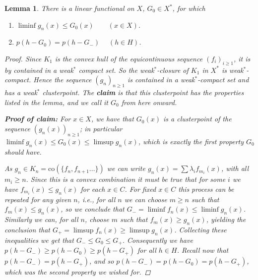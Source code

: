 \documentclass[10pt,twoside,openany,final]{memoir}
\theoremstyle{break}
\newtheorem{lemma}[section]{Lemma}
\theoremstyle{Break}
\begin{document}
\begin{lemma} \label{pryce 6}
There is a linear functional on $X$, $G_{0}\in X^*$, for which
\begin{enumerate}
\item $\liminf g_n(x) \leq G_{0}(x) \qquad (x\in X)$.
\item $p(h-G_{0})=p(h-G_{-}) \quad \; (h\in H)$.
\end{enumerate}
\begin{proof}
Since $K_1$ is the convex hull of the equicontinuous sequence $(f_i)_{i\geq1}$, it is by  contained in a weak$^*$ compact set. So the weak$^*$-closure of $K_1$ in $X^*$ is weak$^*$-compact.
Hence the sequence $(g_n)_{n\geq 1}$ is contained in a weak$^*$-compact set and has a weak$^*$ clusterpoint.
The \textbf{claim} is that this clusterpoint has the properties listed in the lemma, and we call it $G_0$ from here onward.

\textbf{Proof of claim:} For $x\in X$, we have that $G_0(x)$ is a clusterpoint of the sequence $(g_n(x))_{n\geq1}$; in particular $\displaystyle \liminf g_n(x) \leq G_0(x) \leq \limsup g_n(x)$, which is exactly the first property $G_0$ should have.

\noindent As $g_n\in K_n = \text{co}(\{f_n, f_{n+1}...\})$ we can write $\displaystyle g_n(x)=\sum \lambda_i f_{m_{i}}(x)$, with all $m_i\geq n$.
Since this is a convex combination it must be true that for some $i$ we have $f_{m_{i}}(x)\leq g_n(x)$ for each $x\in C$.
For fixed $x \in C$ this process can be repeated for any given $n$, i.e., for all $n$ we can choose $m\geq n$ such that $f_{m}(x)\leq g_n(x)$, so we conclude that $\displaystyle G_{-}=\liminf f_n(x) \leq \liminf g_n(x)$.
Similarly we can, for all $n$, choose $m$ such that $f_m(x) \geq g_n(x)$, yielding the conclusion that $\displaystyle G_{+} = \limsup f_n(x) \geq \limsup g_n(x)$.
Collecting these inequalities we get that $G_{-}\leq G_0 \leq G_{+}$. Consequently we have $p(h-G_{-}) \geq p(h-G_{0}) \geq p(h-G_{+})$ for all $h\in H$.
Recall now that $p(h-G_{-})=p(h-G_{+})$, and so $p(h-G_{-}) =p(h-G_{0}) = p(h-G_{+})$, which was the second property we wished for.

\end{proof}
\end{lemma}
\end{document}
